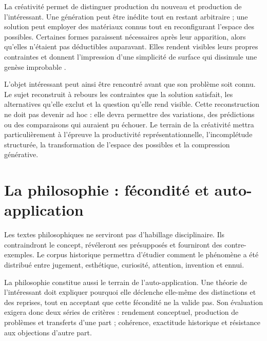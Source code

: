 \documentclass[11pt,a4paper]{article}
\begin{document}
La créativité permet de distinguer production du nouveau et production de
l'intéressant. Une génération peut être inédite tout en restant arbitraire ;
une solution peut employer des matériaux connus tout en reconfigurant l'espace
des possibles. Certaines formes paraissent nécessaires après leur apparition,
alors qu'elles n'étaient pas déductibles auparavant. Elles rendent visibles
leurs propres contraintes et donnent l'impression d'une simplicité de surface
qui dissimule une genèse improbable
\parencite{pachet2026impossibilite,pachet2027virtuosite}.

L'objet intéressant peut ainsi être rencontré avant que son problème soit
connu. Le sujet reconstruit à rebours les contraintes que la solution satisfait,
les alternatives qu'elle exclut et la question qu'elle rend visible. Cette
reconstruction ne doit pas devenir ad hoc : elle devra permettre des variations,
des prédictions ou des comparaisons qui auraient pu échouer. Le terrain de la
créativité mettra particulièrement à l'épreuve la productivité
représentationnelle, l'incomplétude structurée, la transformation de l'espace
des possibles et la compression générative.

\section{La philosophie : fécondité et auto-application}

Les textes philosophiques ne serviront pas d'habillage disciplinaire. Ils
contraindront le concept, révéleront ses présupposés et fourniront des
contre-exemples. Le corpus historique permettra d'étudier comment le phénomène a
été distribué entre jugement, esthétique, curiosité, attention, invention et
ennui.

La philosophie constitue aussi le terrain de l'auto-application. Une théorie de
l'intéressant doit expliquer pourquoi elle déclenche elle-même des distinctions
et des reprises, tout en acceptant que cette fécondité ne la valide pas. Son
évaluation exigera donc deux séries de critères : rendement conceptuel,
production de problèmes et transferts d'une part ; cohérence, exactitude
historique et résistance aux objections d'autre part.
\end{document}

